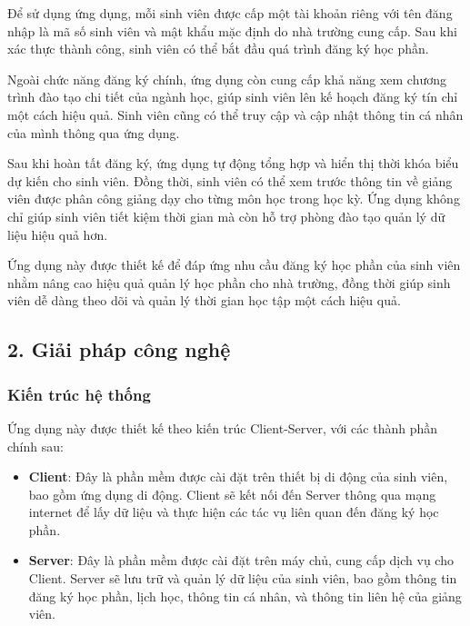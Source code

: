 \documentclass[../main.tex]{subfiles}
\begin{document}
Để sử dụng ứng dụng, mỗi sinh viên được cấp một tài khoản riêng với tên đăng nhập là mã số sinh viên và mật khẩu mặc định do nhà trường cung cấp. Sau khi xác thực thành công, sinh viên có thể bắt đầu quá trình đăng ký học phần.

Ngoài chức năng đăng ký chính, ứng dụng còn cung cấp khả năng xem chương trình đào tạo chi tiết của ngành học, giúp sinh viên lên kế hoạch đăng ký tín chỉ một cách hiệu quả. Sinh viên cũng có thể truy cập và cập nhật thông tin cá nhân của mình thông qua ứng dụng.

Sau khi hoàn tất đăng ký, ứng dụng tự động tổng hợp và hiển thị thời khóa biểu dự kiến cho sinh viên. Đồng thời, sinh viên có thể xem trước thông tin về giảng viên được phân công giảng dạy cho từng môn học trong học kỳ.
Ứng dụng không chỉ giúp sinh viên tiết kiệm thời gian mà còn hỗ trợ phòng đào tạo quản lý dữ liệu hiệu quả hơn.

Ứng dụng này được thiết kế để đáp ứng nhu cầu đăng ký học phần của sinh viên nhằm nâng cao hiệu quả quản lý học phần cho nhà trường, đồng thời giúp sinh viên dễ dàng theo dõi và quản lý thời gian học tập một cách hiệu quả.

\subsection*{2. Giải pháp công nghệ}

\subsubsection*{Kiến trúc hệ thống}

Ứng dụng này được thiết kế theo kiến trúc Client-Server, với các thành phần chính sau:

\begin{itemize}
    \item \textbf{Client}: Đây là phần mềm được cài đặt trên thiết bị di động của sinh viên, bao gồm ứng dụng di động. Client sẽ kết nối đến Server thông qua mạng internet để lấy dữ liệu và thực hiện các tác vụ liên quan đến đăng ký học phần.
    \item \textbf{Server}: Đây là phần mềm được cài đặt trên máy chủ, cung cấp dịch vụ cho Client. Server sẽ lưu trữ và quản lý dữ liệu của sinh viên, bao gồm thông tin đăng ký học phần, lịch học, thông tin cá nhân, và thông tin liên hệ của giảng viên.
\end{itemize}
\end{document}
